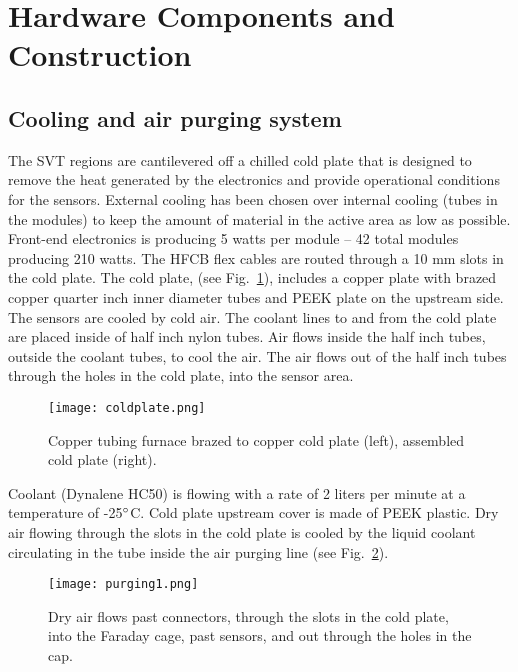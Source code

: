 \section{Hardware Components and Construction}

\subsection{Cooling and air purging system}

The SVT regions are cantilevered off a chilled cold plate that is designed to remove the heat generated by the electronics and provide operational  conditions for the sensors. External cooling has been chosen over internal cooling (tubes in the modules) to keep the amount of material in the active area as low as possible. Front-end electronics is producing 5 watts per module -- 42 total modules producing 210 watts. The HFCB flex cables are routed through a 10 mm slots in the cold plate. The cold plate, (see Fig.~\ref{fig:coldplate}), includes a copper plate with brazed  copper quarter inch inner diameter tubes and PEEK plate on the upstream side. The sensors are cooled by cold air.  The coolant lines to and from the cold plate are placed inside of half inch nylon tubes.  Air flows inside the half inch tubes, outside the coolant tubes, to cool the air.  The air flows out of the half inch tubes through the holes in the cold plate, into the sensor area.

\begin{figure}[hbt] 
\centering 
\texttt{[image: coldplate.png]}
\caption{Copper tubing furnace brazed to copper cold plate (left), assembled cold plate (right).}
\label{fig:coldplate}
\end{figure}


Coolant (Dynalene HC50) is flowing with a rate of 2 liters per minute at a temperature of -25$\degree$C. Cold plate upstream cover is made of PEEK plastic. Dry air flowing through the slots in the cold plate is cooled by the liquid coolant circulating in the tube inside the air purging line (see Fig.~\ref{fig:purging1}). 

\begin{figure}[hbt] 
\centering 
\texttt{[image: purging1.png]}
\caption{Dry air flows past connectors, through the slots in the cold plate, into the Faraday cage, past sensors, and out through the holes in the cap.}
\label{fig:purging1}
\end{figure}

